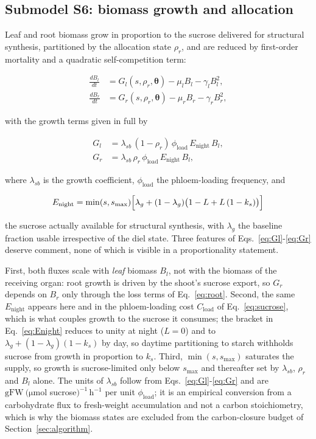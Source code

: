 \documentclass[a4paper,fleqn]{cas-sc}
\begin{document}
\subsection{Submodel S6: biomass growth and allocation}
\label{sec:allocation}

Leaf and root biomass grow in proportion to the sucrose delivered for
structural synthesis, partitioned by the allocation state $\rho_r$, and are
reduced by first-order mortality and a quadratic self-competition term:

\begin{align}
\frac{dB_l}{dt} &=
G_l(s,\rho_r,\boldsymbol{\theta})
- \mu_l B_l
- \gamma_l B_l^{2},
\label{eq:leaf}\\[4pt]
\frac{dB_r}{dt} &=
G_r(s,\rho_r,\boldsymbol{\theta})
- \mu_r B_r
- \gamma_r B_r^{2},
\label{eq:root}
\end{align}

with the growth terms given in full by

\begin{align}
G_l &= \lambda_{sb}\,(1-\rho_r)\,\phi_{\text{load}}\,E_{\text{night}}\,B_l,
\label{eq:Gl}\\[4pt]
G_r &= \lambda_{sb}\,\rho_r\,\phi_{\text{load}}\,E_{\text{night}}\,B_l,
\label{eq:Gr}
\end{align}

where $\lambda_{sb}$ is the growth coefficient, $\phi_{\text{load}}$ the
phloem-loading frequency, and

\begin{equation}
E_{\text{night}} =
\min(s,s_{\max})
\Bigl[
\lambda_g + (1-\lambda_g)\bigl(1 - L + L\,(1-k_s)\bigr)
\Bigr]
\label{eq:Enight}
\end{equation}

the sucrose actually available for structural synthesis, with $\lambda_g$ the
baseline fraction usable irrespective of the diel state. Three features of
Eqs.~\eqref{eq:Gl}-\eqref{eq:Gr} deserve comment, none of which is visible in
a proportionality statement.

First, both fluxes scale with \emph{leaf} biomass $B_l$, not with the biomass
of the receiving organ: root growth is driven by the shoot's sucrose export,
so $G_r$ depends on $B_r$ only through the loss terms of
Eq.~\eqref{eq:root}. Second, the same $E_{\text{night}}$ appears here and in
the phloem-loading cost $C_{\text{load}}$ of Eq.~\eqref{eq:sucrose}, which is
what couples growth to the sucrose it consumes; the bracket in
Eq.~\eqref{eq:Enight} reduces to unity at night ($L=0$) and to
$\lambda_g + (1-\lambda_g)(1-k_s)$ by day, so daytime partitioning to starch
withholds sucrose from growth in proportion to $k_s$. Third,
$\min(s,s_{\max})$ saturates the supply, so growth is sucrose-limited only
below $s_{\max}$ and thereafter set by $\lambda_{sb}$, $\rho_r$ and $B_l$
alone. The units of $\lambda_{sb}$ follow from
Eqs.~\eqref{eq:Gl}-\eqref{eq:Gr} and are $\mathrm{gFW\ (\mu mol}$
sucrose$)^{-1}\,\mathrm{h^{-1}}$ per unit $\phi_{\text{load}}$; it is an
empirical conversion from a carbohydrate flux to fresh-weight accumulation
and not a carbon stoichiometry, which is why the biomass states are excluded
from the carbon-closure budget of Section~\ref{sec:algorithm}.
\end{document}
